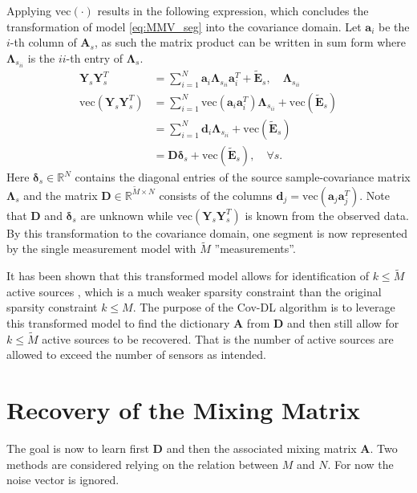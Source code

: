Applying $\text{vec}(\cdot)$ results in the following expression, which concludes the transformation of model \eqref{eq:MMV_seg} into the covariance domain. 
Let $\textbf{a}_i$ be the $i$-th column of $\textbf{A}_s$, as such the matrix product can be written in sum form where $\boldsymbol{\Lambda}_{s_{ii}}$ is the $ii$-th entry of $\boldsymbol{\Lambda}_s$.  
\begin{align}
\mathbf{Y}_s \mathbf{Y}_s^T &= \sum_{i=1}^{N} \textbf{a}_i \boldsymbol{\Lambda}_{s_{ii}} \textbf{a}_i^{T} + \widetilde{\textbf{E}}_s, \quad \boldsymbol{\Lambda}_{s_{ii}} \nonumber \\
\text{vec}\left( \mathbf{Y}_s \mathbf{Y}_s^T \right) &= \sum_{i=1}^N \text{vec}(\mathbf{a}_i \mathbf{a}_i^T) \boldsymbol{\Lambda}_{s_{ii}} + \text{vec}( \widetilde{\textbf{E}}_s) \nonumber \\
&= \sum_{i=1}^N \mathbf{d}_i \boldsymbol{\Lambda}_{s_{ii}} + \text{vec}( \widetilde{\textbf{E}}_s) \nonumber \\
&= \mathbf{D} \boldsymbol{\delta}_s + \text{vec}( \widetilde{\textbf{E}}_s), \quad \forall s. \label{eq:cov1}
\end{align}
Here $\boldsymbol{\delta}_s \in \mathbb{R}^{N}$ contains the diagonal entries of the source sample-covariance matrix $\boldsymbol{\Lambda}_s$
and the matrix $\mathbf{D} \in \mathbb{R}^{\widetilde{M} \times N}$ consists of the columns $\mathbf{d}_j = \text{vec}(\mathbf{a}_j \mathbf{a}_j^T)$. Note that $\mathbf{D}$ and $\boldsymbol{\delta}_s$ are unknown while $\text{vec}\left( \mathbf{Y}_s \mathbf{Y}_s^T \right)$ is known from the observed data.
By this transformation to the covariance domain, one segment is now represented by the single measurement model with $\widetilde{M}$ ''measurements''. 

It has been shown that this transformed model allows for identification of $k \leq \widetilde{M}$ active sources \cite{Pal2015}, which is a much weaker sparsity constraint than the original sparsity constraint $k \leq M$. 
The purpose of the Cov-DL algorithm is to leverage this transformed model to find the dictionary $\mathbf{A}$ from $\mathbf{D}$ and then still allow for $k \leq \widetilde{M}$ active sources to be recovered. 
That is the number of active sources are allowed to exceed the number of sensors as intended.

\section{Recovery of the Mixing Matrix}
The goal is now to learn first $\textbf{D}$ and then the associated mixing matrix $\textbf{A}$. 
Two methods are considered relying on the relation between $M$ and $N$. 
For now the noise vector is ignored.


